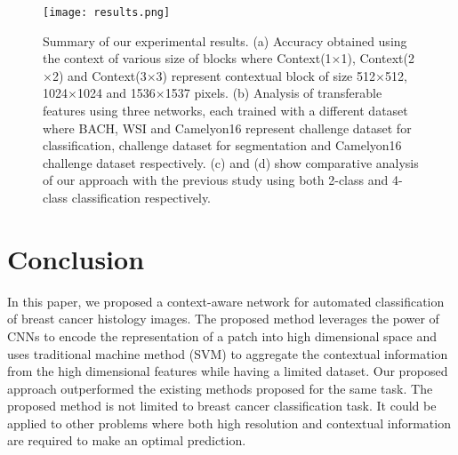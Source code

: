 \documentclass[runningheads,a4paper]{llncs}
\begin{document}
\begin{figure}[ht]
\centering
\texttt{[image: results.png]}
\caption{Summary of our experimental results. (a) Accuracy obtained using the context of various size of blocks where Context(1$\times$1), Context(2$\times$2) and Context(3$\times$3) represent contextual block of size 512$\times$512, 1024$\times$1024 and 1536$\times$1537 pixels. (b) Analysis of transferable features using three networks, each trained with a different dataset where BACH, WSI and Camelyon16 represent challenge dataset for classification, challenge dataset for segmentation and Camelyon16 challenge dataset respectively. (c) and (d) show comparative analysis of our approach with the previous study \cite{araujo2017classification} using both 2-class and 4-class classification respectively.}
\label{fig:comparison_results}
\end{figure}

\section{Conclusion}

In this paper, we proposed a context-aware network for automated classification of breast cancer histology images. The proposed method leverages the power of CNNs to encode the representation of a patch into high dimensional space and uses traditional machine method (SVM) to aggregate the contextual information from the high dimensional features while having a limited dataset. Our proposed approach outperformed the existing methods proposed for the same task. The proposed method is not limited to breast cancer classification task. It could be applied to other problems where both high resolution and contextual information are required to make an optimal prediction.
\end{document}
